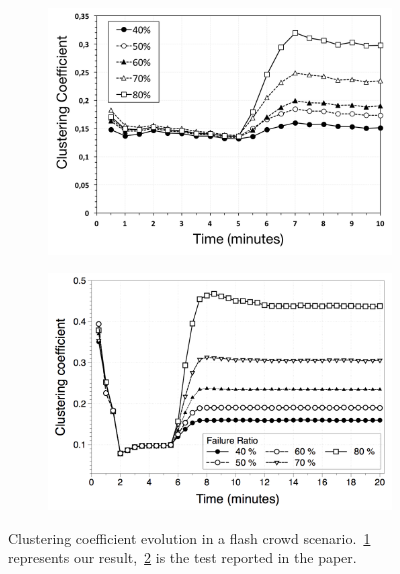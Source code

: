 \begin{figure}
\centering
\begin{subfigure}{.5\textwidth}
  \centering
  \includegraphics[keepaspectratio=true, width=1\linewidth]{images/average_clustering_coefficient_failures}
  \caption{}
  \label{fig:average_clustering_coefficient_failures}
\end{subfigure}%
\begin{subfigure}{.5\textwidth}
  \centering
  \includegraphics[keepaspectratio=true, width=1\linewidth]{images/paper_average_clustering_coefficient_failures}
  \caption{}
  \label{fig:paper_average_clustering_coefficient_failures}
\end{subfigure}
\caption{Clustering coefficient evolution in a flash crowd scenario.~\ref{fig:average_clustering_coefficient_failures} represents our result,~\ref{fig:paper_average_clustering_coefficient_failures} is the test reported in the paper.}
\label{fig:robustness_clustering_coefficient_failures}
\end{figure}

